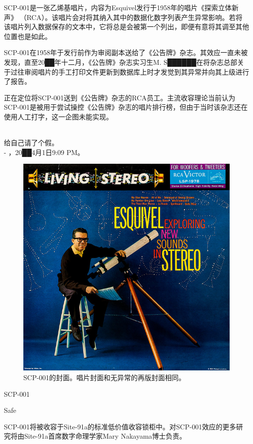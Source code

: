 SCP-001是一张乙烯基唱片，内容为Esquivel发行于1958年的唱片《探索立体新声》 （RCA）。该唱片会对将其纳入其中的数据化数字列表产生异常影响。若将该唱片列入数据保存的文本中，它将总是会被第一个列出，即便有意将其调至其他位置也是如此。

SCP-001在1958年于发行前作为审阅副本送给了《公告牌》杂志。其效应一直未被发现，直至20██年十二月，《公告牌》杂志实习生M. S██████在将杂志总部关于过往审阅唱片的手工打印文件更新到数据库上时才发觉到其异常并向其上级进行了报告。

正在定位将SCP-001送到《公告牌》杂志的RCA员工。主流收容理论当前认为SCP-001是被用于尝试操控《公告牌》杂志的唱片排行榜，但由于当时该杂志还在使用人工打字，这一企图未能实现。


\newpage



\begin{scpbox}
 \\
给自己请了个假。 \\
- ，20██4月1日9:09 PM。
\end{scpbox}

\begin{figure}[H]
	\centering
	\includegraphics[width=0.5\linewidth]{images/SCP.001.a.record.2.jpg}
	\caption*{SCP-001的封面。唱片封面和无异常的再版封面相同。}
\end{figure}

SCP-001

Safe

SCP-001将被收容于Site-91a的标准低价值收容锁柜中。对SCP-001效应的更多研究将由Site-91a首席数字命理学家Mary Nakayama博士负责。

